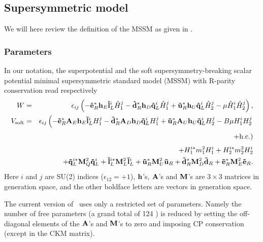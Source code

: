 \label{sec:ge}

\subsection{Supersymmetric model}

We will here review the definition of the MSSM as given in \cite{ds4}.

\subsubsection{Parameters}

In our notation, the superpotential and the soft supersymmetry-breaking scalar
potential minimal supersymmetric standard model (MSSM) with R-parity
conservation \cite{Haber:1984rc,Gunion:1984yn,Haber:1988px} read respectively
\begin{eqnarray}
  W &=& \epsilon_{ij} \left(
  - {\bf \hat{e}}_{R}^{*} {\bf h}_E {\bf \hat{l}}^i_{L} {\hat H}^j_1 
  - {\bf \hat{d}}_{R}^{*} {\bf h}_D {\bf \hat{q}}^i_{L} {\hat H}^j_1 
  + {\bf \hat{u}}_{R}^{*} {\bf h}_U {\bf \hat{q}}^i_{L} {\hat H}^j_2 
  - \mu {\hat H}^i_1 {\hat H}^j_2 
  \right),
\\
  V_{{\rm soft}} & = & 
  \epsilon_{ij} \left(
    -{\bf \tilde{e}}_{R}^{*} {\bf A}_E {\bf h}_E {\bf \tilde{l}}^i_{L} H^j_1 
  - {\bf \tilde{d}}_{R}^{*} {\bf A}_D {\bf h}_D {\bf \tilde{q}}^i_{L} H^j_1 
  + {\bf \tilde{u}}_{R}^{*} {\bf A}_U {\bf h}_U {\bf \tilde{q}}^i_{L} H^j_2
  - B \mu H^i_1 H^j_2 
  \right. \nonumber \\ && \phantom{\epsilon_{ij} \Bigl(} \left.
  + {\rm h.c.} 
  \right) \nonumber \\ &&
  + H^{i*}_1 m_1^2 H^i_1 + H^{i*}_2 m_2^2 H^i_2
  \nonumber \\ && +
  {\bf \tilde{q}}_{L}^{i*} {\bf M}_{Q}^{2} {\bf \tilde{q}}^i_{L} + 
  {\bf \tilde{l}}_{L}^{i*} {\bf M}_{L}^{2} {\bf \tilde{l}}^i_{L} + 
  {\bf \tilde{u}}_{R}^{*} {\bf M}_{U}^{2} {\bf \tilde{u}}_{R} + 
  {\bf \tilde{d}}_{R}^{*} {\bf M}_{D}^{2} {\bf \tilde{d}}_{R} + 
  {\bf \tilde{e}}_{R}^{*} {\bf M}_{E}^{2} {\bf \tilde{e}}_{R} .
\end{eqnarray}
Here $i$ and $j$ are SU(2) indices ($\epsilon_{12} = +1$), ${\bf h}$'s, ${\bf
  A}$'s and ${\bf M}$'s are $3\times3$ matrices in generation space,
and the other boldface letters are vectors in generation space.
  
The current version of \ds\ uses only a restricted set of parameters.
Namely the number of free parameters (a grand total of 124 \cite{Dimopoulos:1995kn})
is reduced by setting the off-diagonal elements of the ${\bf A}$'s and ${\bf
  M}$'s to zero and imposing CP conservation (except in the CKM matrix). 

